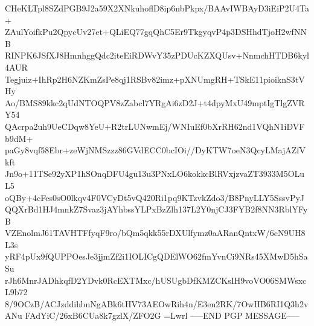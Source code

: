 CHeKLTpl8SZdPGB9J2a59X2XNkuhoflD8ip6nbPkpx/BAAvIWBAyD3iEiP2U4Ta+
ZAulYoifkPu2QpycUv27et+QLiEQ77gqQhC5Er9TkgyqvP4p3DSHhdTjoH2wfNNB
RINPK6JSfXJ8HmnhggQdc2iteEiRDWvY35zPDUcKZXQUsv+NnmchHTDB6kyl4AUR
Tegjuiz+IhRp2H6NZKmZsPe8qj1RSBv82imz+pXNUmgRH+TSkE11pioiknS3tVHy
Ao/BMS89kkc2qUdNTOQPV8zZabcl7YRgAi6zD2J+t4dpyMxU49mptIgTlgZVRY54
QAcrpa2uh9UeCDqw8YeU+R2trLUNwmEj/WNIuEf0bXrRH62nd1VQhN1iDVFb9dM+
paGy8vqf58Ebr+zeWjNMSzzz86GVdECC0bcIOi//DyKTW7oeN3QcyLMajAZfVkft
Jn9o+11TSe92yXP1hSOnqDFU4gu13u3PNxLO6kokkcBlRVxjzvaZT3933M5OLuL5
oQBy+4cFes0sO0lkqv4F0VCyDt5vQ420Ri1pq9KTzvkZdo3/B8PnyLLY5SssvPyJ
QQXrBd1HJ4mnkZ7Svaz3jAYhbssYLPxBzZlh137L2Y0njCJ3FYB2f8NN3RblYFyB
VZEnolmJ61TAVHTFfyqF9ro/bQm5qkk55rDXUlfymz0aARanQntxW/6cN9UH8L3s
yRF4pUx9fQUPPOesJe3jjmZf2i1IOLICgQDElWO62fmYvnCi9NRs45XMwD5hSaSu
rJh6MnrJADhkqfD2YDvk0RcEXTMxc/hUSUgbDfKMZCKsIH9voVO06SMWsxcL9b72
8/9OCzB/ACJzddihbnNgABk6tHV73AEOwRih4n/E3en2RK/7OwHB6RI1Q3h2vANu
FAdYiC/26xB6CUa8k7gzlX/ZFO2G
=Lwrl
-----END PGP MESSAGE-----
